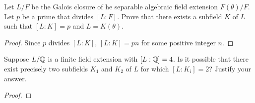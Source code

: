 \begin{problem}
Let $L/F$ be the Galois closure of he separable algebraic field extension
$F(\theta)/F$. Let $p$ be a prime that divides $[L:F]$. Prove that there
exists a subfield $K$ of $L$ such that $[L:K]=p$ and $L=K(\theta)$.
\end{problem}
\begin{proof}
Since $p$ divides $[L:K]$, $[L:K]=pn$ for some positive integer
$n$.
\end{proof}
\begin{problem}
Suppose $L/\mathbb{Q}$ is a finite field extension with $[L:\mathbb{Q}]=4$. Is it
possible that there exist precisely two subfields $K_1$ and $K_2$ of $L$
for which $[L:K_i]=2$? Justify your answer.
\end{problem}
\begin{proof}
\end{proof}

